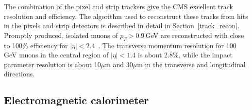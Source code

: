 The combination of the pixel and strip trackers give the CMS excellent track resolution and efficiency. The algorithm used to reconstruct these tracks from hits in the pixels and strip detectors is described in detail in Section~\ref{track_recon}.  Promptly  produced,  isolated  muons  of $p_{T}>0.9$\,GeV are reconstructed with close to 100\% efficiency for $|\eta|<2.4$~\cite{track_reconstruction}. The transverse momentum resolution for 100\,GeV muons in the central region of $|\eta|<1.4$ is about 2.8\%, while the impact parameter resolution is about 10$\mu$m and 30$\mu$m in the transverse and longitudinal directions.


\subsection{Electromagnetic calorimeter}
\label{Ecal}
